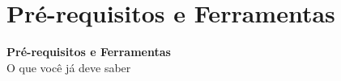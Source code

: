 \documentclass[aspectratio=169]{beamer}
\begin{document}
\section{Pr\'{e}-requisitos e Ferramentas}

{
\begin{frame}[plain,c]
\begin{center}
{\Huge\textbf{Pr\'{e}-requisitos e Ferramentas}}\\[0.8cm]
{\LARGE O que voc\^{e} j\'{a} deve saber}
\end{center}
\end{frame}
}
\end{document}
